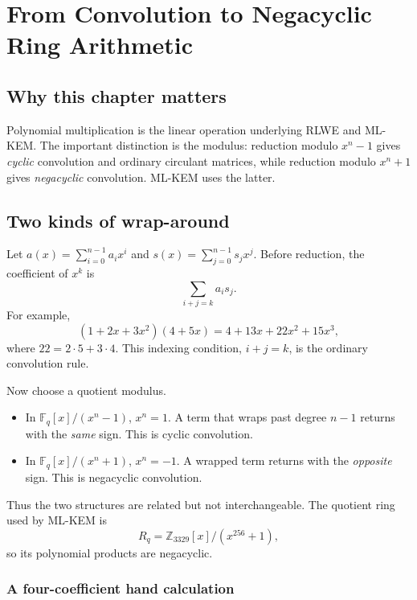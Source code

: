 \chapter{From Convolution to Negacyclic Ring Arithmetic}
\label{ch:convolution}

\section{Why this chapter matters}

Polynomial multiplication is the linear operation underlying RLWE and ML-KEM. The important distinction is the modulus: reduction modulo $x^n-1$ gives \emph{cyclic} convolution and ordinary circulant matrices, while reduction modulo $x^n+1$ gives \emph{negacyclic} convolution. ML-KEM uses the latter.

\section{Two kinds of wrap-around}

Let $a(x)=\sum_{i=0}^{n-1}a_i x^i$ and $s(x)=\sum_{j=0}^{n-1}s_j x^j$. Before reduction, the coefficient of $x^k$ is
\[
  \sum_{i+j=k} a_i s_j.
\]
For example,
\[
(1+2x+3x^2)(4+5x)=4+13x+22x^2+15x^3,
\]
where $22=2\cdot5+3\cdot4$. This indexing condition, $i+j=k$, is the ordinary convolution rule.

Now choose a quotient modulus.
\begin{itemize}
  \item In $\mathbb{F}_q[x]/(x^n-1)$, $x^n=1$. A term that wraps past degree $n-1$ returns with the \emph{same} sign. This is cyclic convolution.
  \item In $\mathbb{F}_q[x]/(x^n+1)$, $x^n=-1$. A wrapped term returns with the \emph{opposite} sign. This is negacyclic convolution.
\end{itemize}

Thus the two structures are related but not interchangeable. The quotient ring used by ML-KEM is
\[
 R_q=\mathbb{Z}_{3329}[x]/(x^{256}+1),
\]
so its polynomial products are negacyclic.

\subsection{A four-coefficient hand calculation}

